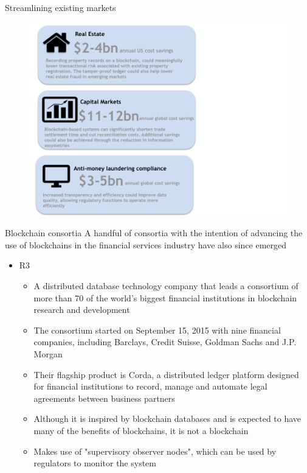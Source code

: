 \documentclass[11pt]{beamer}
\begin{document}

\begin{frame}{Streamlining existing markets}
	\begin{figure}[]
		\centering
		\includegraphics  [scale=0.3]{Images/savings}
	\end{figure}
\end{frame}


\begin{frame}{Blockchain consortia}
	A handful of consortia with the intention of advancing the use of blockchains in the financial services industry have also since emerged
	\begin{itemize}
		\item R3
		\begin{itemize}
			\item A distributed database technology company that leads a consortium of more than 70 of the world's biggest financial institutions in blockchain research and development
			\item The consortium started on September 15, 2015 with nine financial companies, including Barclays, Credit Suisse, Goldman Sachs and J.P. Morgan
			\item Their flagship product is Corda, a distributed ledger platform designed for financial institutions to record, manage and automate legal agreements between business partners
			\item Although it is inspired by blockchain databases and is expected to have many of the benefits of blockchains, it is not a blockchain
			\item Makes use of "supervisory observer nodes", which can be used by regulators to monitor the system
		\end{itemize}
	\end{itemize}
\end{frame}
\end{document}
